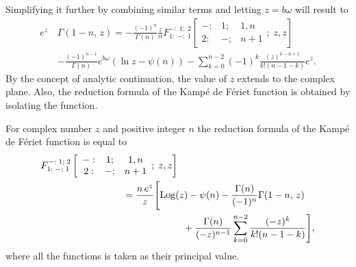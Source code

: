 Simplifying it further by combining similar terms and letting $z = b\omega$ will result to
\begin{equation}
\begin{split}
     e^{z} \,& \Gamma(1-n,\, z) = -\frac{(-1)^n}{\Gamma(n)} \frac{z}{n} F^{-:\;1;\;2}_{1:\;-;\;1}\left[\begin{array}{ccc}
     -:& 1; & 1, n  \\
     2:& -; & n+1 
    \end{array};\;  z,z\right] \\& - \frac{(-1)^{n-1}}{\Gamma(n)} e^{b \omega} (\ln{z} - \psi(n)) - \sum_{k=0}^{n-2} (-1)^{k} \frac{(z)^{k-n+1}}{k!(n-1-k)} e^{z}.
\end{split}
\end{equation}
By the concept of analytic continuation, the value of $z$ extends to the complex plane. Also, the reduction formula of the Kampé de Fériet function is obtained by isolating the function. 

\begin{theorem}
For complex number $z$ and positive integer $n$ the reduction formula of the Kampé de Fériet function is equal to
\begin{equation}
\begin{split}
      F^{-:\;1;\;2}_{1:\;-;\;1}\left[\begin{array}{ccc}
     -:& 1; & 1, n  \\
     2:& -; & n+1 
    \end{array};\;  z,z\right] & \\&\hspace{-20mm} = \frac{n \, e^{z}}{z} \Bigg[\mathrm{Log}(z) -\psi(n) - \frac{\Gamma(n)}{(-1)^{n}} \Gamma(1-n,\,z) \\&\hspace{2mm} + \frac{\Gamma(n)}{(-z)^{n-1}} \sum_{k=0}^{n-2} \frac{(-z)^{k}}{k!(n-1-k)}
    \Bigg],
\end{split}
\end{equation}
where all the functions is taken as their principal value.
\end{theorem}

